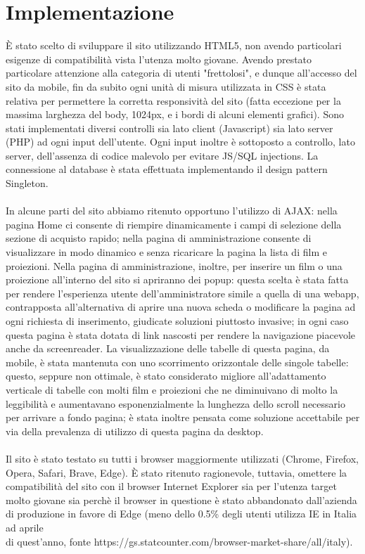\documentclass[a4paper, 12pt]{article}
\begin{document}
\section{Implementazione}
È stato scelto di sviluppare il sito utilizzando HTML5, non avendo particolari esigenze di compatibilità vista l'utenza molto giovane.
Avendo prestato particolare attenzione alla categoria di utenti "frettolosi", e dunque all'accesso del sito da mobile, fin da subito ogni unità di misura utilizzata in CSS è stata relativa per permettere la corretta responsività del sito (fatta eccezione per la massima larghezza del body, 1024px, e i bordi di alcuni elementi grafici).
Sono stati implementati diversi controlli sia lato client (Javascript) sia lato server (PHP) ad ogni input dell'utente.
Ogni input inoltre è sottoposto a controllo, lato server, dell'assenza di codice malevolo per evitare JS/SQL injections.
La connessione al database è stata effettuata implementando il design pattern Singleton.\\\\
In alcune parti del sito abbiamo ritenuto opportuno l'utilizzo di AJAX: nella pagina Home ci consente di riempire dinamicamente i campi di selezione della sezione di acquisto rapido; nella pagina di amministrazione consente di visualizzare in modo dinamico e senza ricaricare la pagina la lista di film e proiezioni.
Nella pagina di amministrazione, inoltre, per inserire un film o una proiezione all'interno del sito si apriranno dei popup: questa scelta è stata fatta per rendere l'esperienza utente dell'amministratore simile a quella di una webapp, contrapposta all'alternativa di aprire una nuova scheda o modificare la pagina ad ogni richiesta di inserimento, giudicate soluzioni piuttosto invasive; in ogni caso questa pagina è stata dotata di link nascosti per rendere la navigazione piacevole anche da screenreader. La visualizzazione delle tabelle di questa pagina, da mobile, è stata mantenuta con uno scorrimento orizzontale delle singole tabelle: questo, seppure non ottimale, è stato considerato migliore all'adattamento verticale di tabelle con molti film e proiezioni che ne diminuivano di molto la leggibilità e aumentavano esponenzialmente la lunghezza dello scroll necessario per arrivare a fondo pagina; è stata inoltre pensata come soluzione accettabile per via della prevalenza di utilizzo di questa pagina da desktop.\\\\
Il sito è stato testato su tutti i browser maggiormente utilizzati (Chrome, Firefox, Opera, Safari, Brave, Edge). È stato ritenuto ragionevole, tuttavia, omettere la compatibilità del sito con il browser Internet Explorer sia per l'utenza target molto giovane sia perchè il browser in questione è stato abbandonato dall'azienda di produzione in favore di Edge (meno dello 0.5\% degli utenti utilizza IE in Italia ad aprile \\di quest'anno, fonte https://gs.statcounter.com/browser-market-share/all/italy).
\newpage
\end{document}
